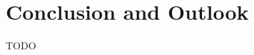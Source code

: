 \documentclass[graybox]{svmult}
\begin{document}

\section{Conclusion and Outlook}
\label{sec:con}
TODO



\end{document}
